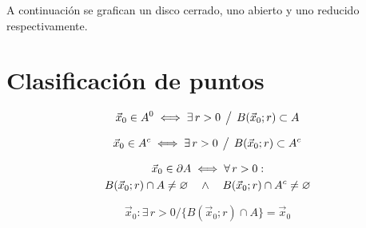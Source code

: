 A continuación se grafican un disco cerrado, uno abierto y uno reducido respectivamente.

\begin{center}
    \def\svgwidth{0.8\linewidth}
    
\end{center}


\section{Clasificación de puntos}

\begin{mdframed}[style=DefinitionFrame]
    \begin{defn}
    \end{defn}
    \begin{equation*}
        \Vec{x}_0 \in A^0 \iff \exists \, r>0 \hspace{1ex} \big/ \hspace{1ex} B(\Vec{x}_0;r) \subset A
    \end{equation*}
\end{mdframed}

\begin{mdframed}[style=DefinitionFrame]
    \begin{defn}
    \end{defn}
    \begin{equation*}
        \Vec{x}_0 \in A^c \iff \exists \, r>0 \hspace{1ex} \big/ \hspace{1ex} B(\Vec{x}_0;r) \subset A^c
    \end{equation*}
\end{mdframed}

\begin{mdframed}[style=DefinitionFrame]
    \begin{defn}
    \end{defn}
    \begin{multline*}
        \Vec{x}_0 \in \partial A \iff \forall \, r>0 : \\ B(\Vec{x}_0;r) \cap A \neq \varnothing \quad \land \quad B(\Vec{x}_0;r) \cap A^c \neq \varnothing
    \end{multline*}
\end{mdframed}

\begin{mdframed}[style=DefinitionFrame]
    \begin{defn}
    \end{defn}
    \begin{equation*}
        \Vec{x}_0 : \exists \, r>0 / \big\{ B(\Vec{x}_0;r) \cap A \big\} = \Vec{x}_0
    \end{equation*}
\end{mdframed}

